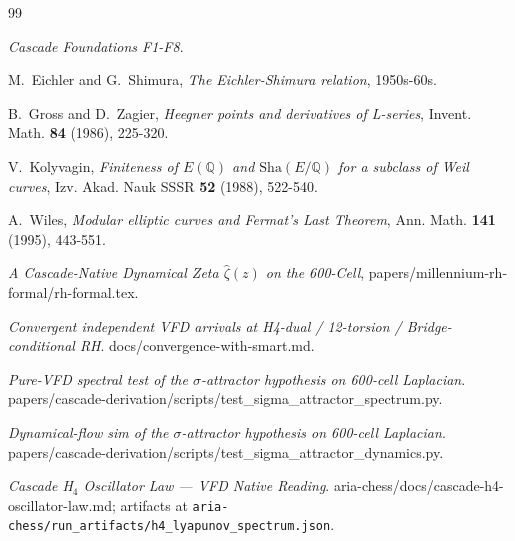 \documentclass[11pt, a4paper]{amsart}
\theoremstyle{definition}
\newcommand{\Q}{\mathbb{Q}}
\newcommand{\Sha}{\mathrm{Sha}}
\begin{document}
\begin{thebibliography}{99}

\emph{Cascade Foundations F1-F8}.

M.~Eichler and G.~Shimura, \emph{The Eichler-Shimura relation},
1950s-60s.

B.~Gross and D.~Zagier, \emph{Heegner points and derivatives of L-series},
Invent. Math. \textbf{84} (1986), 225-320.

V.~Kolyvagin, \emph{Finiteness of $E(\Q)$ and $\Sha(E/\Q)$ for a
subclass of Weil curves}, Izv. Akad. Nauk SSSR \textbf{52} (1988), 522-540.

A.~Wiles, \emph{Modular elliptic curves and Fermat's Last Theorem},
Ann. Math. \textbf{141} (1995), 443-551.

\emph{A Cascade-Native Dynamical Zeta $\widehat\zeta(z)$ on the
600-Cell}, papers/millennium-rh-formal/rh-formal.tex.

\emph{Convergent independent VFD arrivals at H4-dual / 12-torsion /
Bridge-conditional RH}. docs/convergence-with-smart.md.

\emph{Pure-VFD spectral test of the $\sigma$-attractor hypothesis on
600-cell Laplacian}.
papers/cascade-derivation/scripts/test\_sigma\_attractor\_spectrum.py.

\emph{Dynamical-flow sim of the $\sigma$-attractor hypothesis on
600-cell Laplacian}.
papers/cascade-derivation/scripts/test\_sigma\_attractor\_dynamics.py.

\emph{Cascade H$_4$ Oscillator Law — VFD Native Reading}.
aria-chess/docs/cascade-h4-oscillator-law.md;
artifacts at \texttt{aria-chess/run\_artifacts/h4\_lyapunov\_spectrum.json}.

\end{thebibliography}
\end{document}
